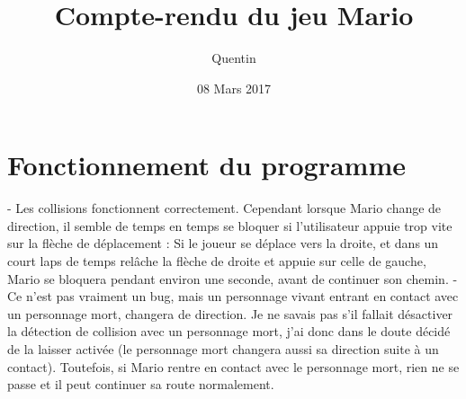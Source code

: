 \documentclass{report}
\title{Compte-rendu du jeu Mario}
\author{Quentin \bsc{SAUVAGE}}
\date{08 Mars 2017}
\begin{document}
\maketitle
\chapter{Fonctionnement du programme}
- Les collisions fonctionnent correctement. Cependant lorsque Mario change de direction, il semble de temps en temps se bloquer si l'utilisateur appuie trop vite sur la flèche de déplacement : Si le joueur se déplace vers la droite, et dans un court laps de temps relâche la flèche de droite et appuie sur celle de gauche, Mario se bloquera pendant environ une seconde, avant de continuer son chemin.
\vspace*{0.5cm}
- Ce n'est pas vraiment un bug, mais un personnage vivant entrant en contact avec un personnage mort, changera de direction. Je ne savais pas s'il fallait désactiver la détection de collision avec un personnage mort, j'ai donc dans le doute décidé de la laisser activée (le personnage mort changera aussi sa direction suite à un contact). Toutefois, si Mario rentre en contact avec le personnage mort, rien ne se passe et il peut continuer sa route normalement.
\end{document}
